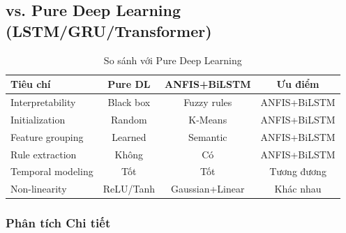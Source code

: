 \documentclass[12pt,a4paper]{article}
\begin{document}
\subsection{vs. Pure Deep Learning (LSTM/GRU/Transformer)}

\begin{table}[h]
\centering
\caption{So sánh với Pure Deep Learning}
\begin{tabular}{lccc}
\toprule
\textbf{Tiêu chí} & \textbf{Pure DL} & \textbf{ANFIS+BiLSTM} & \textbf{Ưu điểm} \\
\midrule
Interpretability & Black box & Fuzzy rules & ANFIS+BiLSTM \\
Initialization & Random & K-Means & ANFIS+BiLSTM \\
Feature grouping & Learned & Semantic & ANFIS+BiLSTM \\
Rule extraction & Không & Có & ANFIS+BiLSTM \\
Temporal modeling & Tốt & Tốt & Tương đương \\
Non-linearity & ReLU/Tanh & Gaussian+Linear & Khác nhau \\
\bottomrule
\end{tabular}
\end{table}

\subsubsection{Phân tích Chi tiết}
\end{document}
